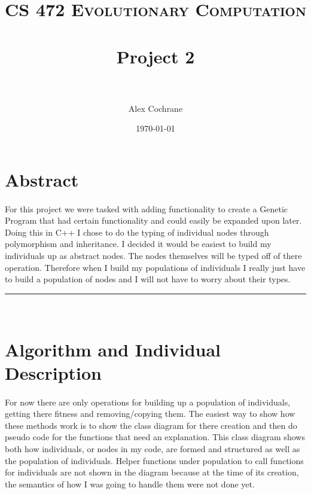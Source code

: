 \documentclass[paper=a4, fontsize=11pt]{scrartcl} %
\title{	
\normalfont \normalsize 
\textsc{CS 472 Evolutionary Computation} \\ [25pt] %
\horrule{0.5pt} \\[0.4cm] %
\huge Project 2 \\ %
\horrule{2pt} \\[0.5cm] %
}
\author{Alex Cochrane} %
\date{\normalsize\today} %
\numberwithin{equation}{section} %
\numberwithin{figure}{section} %
\numberwithin{table}{section} %
\newcommand{\horrule}[1]{\rule{\linewidth}{#1}} %
\begin{document}
\maketitle %


\section{Abstract}


\paragraph{} For this project we were tasked with adding functionality to create a Genetic Program that had certain functionality and could easily be expanded upon later. Doing this in C++ I chose to do the typing of individual nodes through polymorphism and inheritance. I decided it would be easiest to build my individuals up as abstract nodes. The nodes themselves will be typed off of there operation. Therefore when I build my populations of individuals I really just have to build a population of nodes and I will not have to worry about their types.


\horrule{0.5pt} \\[0.4cm] %
\section{Algorithm and Individual Description}

\paragraph{} For now there are only operations for building up a population of individuals, getting there fitness and removing/copying them. The easiest way to show how these methods work is to show the class diagram for there creation and then do pseudo code for the functions that need an explanation. This class diagram shows both how individuals, or nodes in my code, are formed and structured as well as the population of individuals. Helper functions under population to call functions for individuals are not shown in the diagram because at the time of its creation, the semantics of how I was going to handle them were not done yet.
\end{document}
